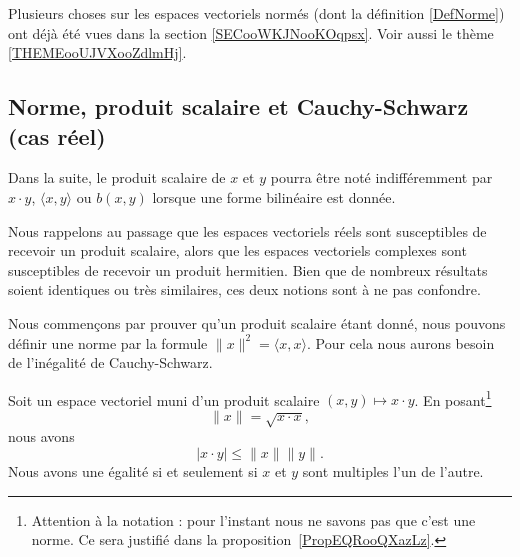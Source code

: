 
Plusieurs choses sur les espaces vectoriels normés (dont la définition \ref{DefNorme}) ont déjà été vues dans la section \ref{SECooWKJNooKOqpsx}. Voir aussi le thème \ref{THEMEooUJVXooZdlmHj}.


\subsection{Norme, produit scalaire et Cauchy-Schwarz (cas réel)}

Dans la suite, le produit scalaire de \( x\) et \( y\) pourra être noté indifféremment par \( x\cdot y\), \( \langle x, y\rangle \) ou \( b(x,y)\) lorsque une forme bilinéaire est donnée.

Nous rappelons au passage que les espaces vectoriels réels sont susceptibles de recevoir un produit scalaire, alors que les espaces vectoriels complexes sont susceptibles de recevoir un produit hermitien. Bien que de nombreux résultats soient identiques ou très similaires, ces deux notions sont à ne pas confondre.

Nous commençons par prouver qu'un produit scalaire étant donné, nous pouvons définir une norme par la formule \( \| x \|^2=\langle x, x\rangle \). Pour cela nous aurons besoin de l'inégalité de Cauchy-Schwarz.

\begin{theorem}      \label{ThoAYfEHG}
    Soit un espace vectoriel muni d'un produit scalaire \( (x,y)\mapsto x\cdot y\). En posant\footnote{Attention à la notation : pour l'instant nous ne savons pas que c'est une norme. Ce sera justifié dans la proposition~\ref{PropEQRooQXazLz}.}
    \begin{equation}
        \| x \|=\sqrt{ x\cdot x },
    \end{equation}
    nous avons
    \begin{equation}        \label{EQooZDSHooWPcryG}
		| x\cdot y |\leq \| x \|\| y \|.
	\end{equation}
    Nous avons une égalité si et seulement si \( x\) et \( y\) sont multiples l'un de l'autre.
\end{theorem}

